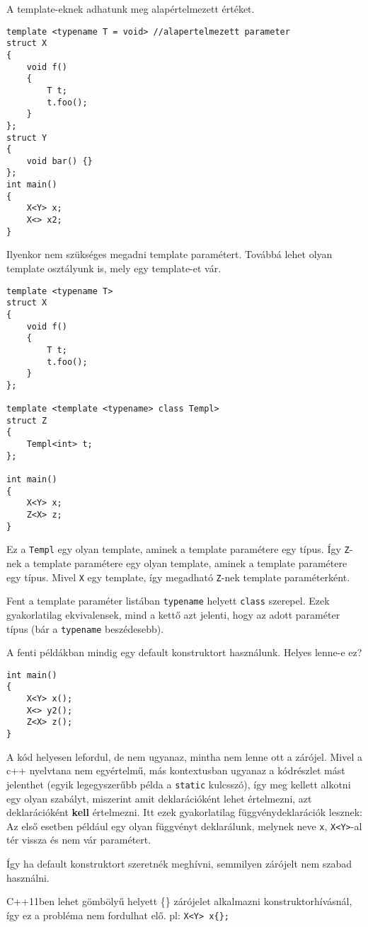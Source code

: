 \documentclass[a4paper,11.5pt,table]{article}
\begin{document}
	A template-eknek adhatunk meg alapértelmezett értéket.

\begin{lstlisting}
template <typename T = void> //alapertelmezett parameter
struct X
{
	void f()
	{
		T t;
		t.foo();
	}
};
struct Y
{
	void bar() {}
};
int main()
{
	X<Y> x;
	X<> x2;
}
\end{lstlisting}
	Ilyenkor nem szükséges megadni template paramétert. Továbbá lehet olyan template osztályunk is, mely egy template-et vár.

\begin{lstlisting}
template <typename T>
struct X
{
	void f()
	{
		T t;
		t.foo();
	}
};

template <template <typename> class Templ>
struct Z
{
	Templ<int> t;
};

int main()
{
	X<Y> x;
	Z<X> z;
}
\end{lstlisting}
	Ez a \texttt{Templ} egy olyan template, aminek a template paramétere egy típus. Így \texttt{Z}-nek a template paramétere egy olyan template, aminek a template paramétere egy típus. Mivel \texttt{X} egy template, így megadható \texttt{Z}-nek template paraméterként.
	\begin{note}
		Fent a template paraméter listában \texttt{typename} helyett \texttt{class} szerepel. Ezek gyakorlatilag ekvivalensek, mind a kettő azt jelenti, hogy az adott paraméter típus (bár a \texttt{typename} beszédesebb).
	\end{note}
	
	A fenti példákban mindig egy default konstruktort használunk. Helyes lenne-e ez?
\begin{lstlisting}
int main()
{
	X<Y> x();
	X<> y2();
	Z<X> z();
}
\end{lstlisting}
	A kód helyesen lefordul, de nem ugyanaz, mintha nem lenne ott a zárójel. Mivel a c++ nyelvtana nem egyértelmű, más kontextusban ugyanaz a kódrészlet mást jelenthet (egyik legegyszerűbb példa a \texttt{static} kulcsszó), így meg kellett alkotni egy olyan szabályt, miszerint amit deklarációként lehet értelmezni, azt deklarációként \textbf{kell} értelmezni. Itt ezek gyakorlatilag függvénydeklarációk lesznek: Az első esetben például egy olyan függvényt deklarálunk, melynek neve \texttt{x}, \texttt{X<Y>}-al tér vissza és nem vár paramétert. 
	
	Így ha default konstruktort szeretnék meghívni, semmilyen zárójelt nem szabad használni.
	\begin{note}
		C++11ben lehet gömbölyű helyett \{\} zárójelet alkalmazni konstruktorhívásnál, így ez a probléma nem fordulhat elő. pl: \texttt{X<Y> x\{\};}
	\end{note}
	
\end{document}
